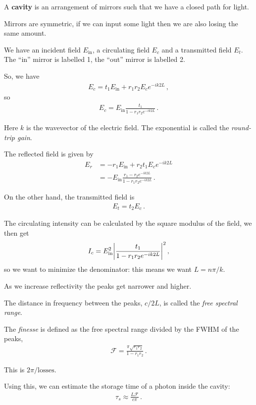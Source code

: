 \documentclass[main.tex]{subfiles}
\begin{document}
A \textbf{cavity} is an arrangement of mirrors such that we have a closed path for light.

Mirrors are symmetric, if we can input some light then we are also losing the same amount.

We have an incident field \(E _{\text{in}}\), a circulating field \(E_{c}\) and a transmitted field \(E_{t}\). The ``in'' mirror is labelled 1, the ``out'' mirror is labelled 2. 

So, we have 
%
\begin{align}
E_{c} = t_1 E _{\text{in}} + r_1 r_2 E_{c} e^{-ik 2L} 
\,,
\end{align}
%
so 
%
\begin{align}
E_{c} = E _{\text{in}} \frac{t_1 }{1 - r_1 r_2 e^{-ik2L}}
\,.
\end{align}

Here \(k\) is the wavevector of the electric field. The exponential is called the \emph{round-trip gain}. 

The reflected field is given by 
%
\begin{align}
E_{r} &= -r_1 E _{\text{in}} + r_2 t_1 E_{c} e^{-ik2L}  \\
&= -E _{\text{in}} \frac{r_1 - r_2 e^{-ik 2L}}{1 - r_1 r_2 e^{-ik2L}}
\,.
\end{align}

On the other hand, the transmitted field is 
%
\begin{align}
E_{t} = t_2 E_c 
\,.
\end{align}

The circulating intensity can be calculated by the square modulus of the field, we then get 
%
\begin{align}
I_{c} = E^2 _{\text{in}} \abs{\frac{t_1 }{1 - r_1 r_2 e^{-ik2L}}}^2
\,,
\end{align}
%
so we want to minimize the denominator: this means we want \(L = n \pi / k\). 

As we increase reflectivity the peaks get narrower and higher. 

The distance in frequency between the peaks, \(c / 2L\), is called the \emph{free spectral range}. 

The \emph{finesse} is defined as the free spectral range divided by the FWHM of the peaks, 
%
\begin{align}
\mathcal{F} = \frac{\pi \sqrt{r_1 r_2 }}{1 - r_1 r_2 }
\,.
\end{align}

This is \(2 \pi  / \text{losses}\).

Using this, we can estimate the storage time of a photon inside the cavity: 
%
\begin{align}
\tau_{s} \approx \frac{L \mathcal{F}}{c \pi }
\,.
\end{align}
\end{document}
